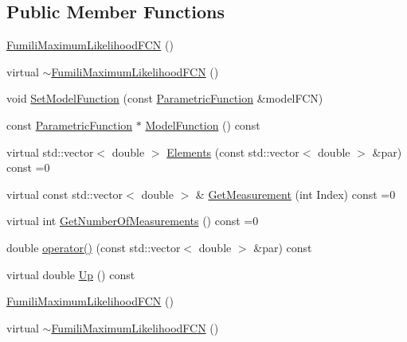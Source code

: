 \subsection*{Public Member Functions}
\begin{DoxyCompactItemize}
\item 
\mbox{\hyperlink{classROOT_1_1Minuit2_1_1FumiliMaximumLikelihoodFCN_ad62f29a2682f961ea769c2596a799abb}{Fumili\+Maximum\+Likelihood\+F\+CN}} ()
\item 
virtual \mbox{\hyperlink{classROOT_1_1Minuit2_1_1FumiliMaximumLikelihoodFCN_ac0973b05cf2e22b6124281d7adf6b90e}{$\sim$\+Fumili\+Maximum\+Likelihood\+F\+CN}} ()
\item 
void \mbox{\hyperlink{classROOT_1_1Minuit2_1_1FumiliMaximumLikelihoodFCN_a1aef27a37fc3a8df63aed6aff19c0c33}{Set\+Model\+Function}} (const \mbox{\hyperlink{classROOT_1_1Minuit2_1_1ParametricFunction}{Parametric\+Function}} \&model\+F\+CN)
\item 
const \mbox{\hyperlink{classROOT_1_1Minuit2_1_1ParametricFunction}{Parametric\+Function}} $\ast$ \mbox{\hyperlink{classROOT_1_1Minuit2_1_1FumiliMaximumLikelihoodFCN_ae1ea41126186d9dd5c83fdcec08cff70}{Model\+Function}} () const
\item 
virtual std\+::vector$<$ double $>$ \mbox{\hyperlink{classROOT_1_1Minuit2_1_1FumiliMaximumLikelihoodFCN_a20aa81dc23ba61ed49ba78f4f9627e59}{Elements}} (const std\+::vector$<$ double $>$ \&par) const =0
\item 
virtual const std\+::vector$<$ double $>$ \& \mbox{\hyperlink{classROOT_1_1Minuit2_1_1FumiliMaximumLikelihoodFCN_ac3e28c8d3e14a1df3145891ae99ac35d}{Get\+Measurement}} (int Index) const =0
\item 
virtual int \mbox{\hyperlink{classROOT_1_1Minuit2_1_1FumiliMaximumLikelihoodFCN_af0a6b5a302f978363074039c7d55d529}{Get\+Number\+Of\+Measurements}} () const =0
\item 
double \mbox{\hyperlink{classROOT_1_1Minuit2_1_1FumiliMaximumLikelihoodFCN_ad06826a1cde84be6bf2a13518c768ca5}{operator()}} (const std\+::vector$<$ double $>$ \&par) const
\item 
virtual double \mbox{\hyperlink{classROOT_1_1Minuit2_1_1FumiliMaximumLikelihoodFCN_ab945da701895bfba143da08f76ba2d05}{Up}} () const
\item 
\mbox{\hyperlink{classROOT_1_1Minuit2_1_1FumiliMaximumLikelihoodFCN_ad62f29a2682f961ea769c2596a799abb}{Fumili\+Maximum\+Likelihood\+F\+CN}} ()
\item 
virtual \mbox{\hyperlink{classROOT_1_1Minuit2_1_1FumiliMaximumLikelihoodFCN_ac0973b05cf2e22b6124281d7adf6b90e}{$\sim$\+Fumili\+Maximum\+Likelihood\+F\+CN}} ()

\end{DoxyCompactItemize}

